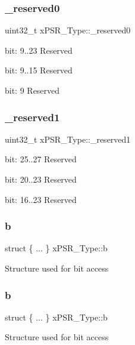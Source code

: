 \subsubsection{\texorpdfstring{\_reserved0}{\_reserved0}}
{\footnotesize\ttfamily uint32\+\_\+t x\+P\+S\+R\+\_\+\+Type\+::\+\_\+reserved0}

bit\+: 9..23 Reserved

bit\+: 9..15 Reserved

bit\+: 9 Reserved \mbox{\label{unionx_p_s_r___type_a790056bb6f20ea16cecc784b0dd19ad6}} 
\subsubsection{\texorpdfstring{\_reserved1}{\_reserved1}}
{\footnotesize\ttfamily uint32\+\_\+t x\+P\+S\+R\+\_\+\+Type\+::\+\_\+reserved1}

bit\+: 25..27 Reserved

bit\+: 20..23 Reserved

bit\+: 16..23 Reserved \mbox{\label{unionx_p_s_r___type_a45ed8981cba3995bc0bd339cb99ba018}} 
\subsubsection{\texorpdfstring{b}{b}\hspace{0.1cm}{\footnotesize\ttfamily [1/12]}}
{\footnotesize\ttfamily struct \{ ... \}   x\+P\+S\+R\+\_\+\+Type\+::b}

Structure used for bit access \mbox{\label{unionx_p_s_r___type_a073e368aa26838bc09405b46e740ade0}} 
\subsubsection{\texorpdfstring{b}{b}\hspace{0.1cm}{\footnotesize\ttfamily [2/12]}}
{\footnotesize\ttfamily struct \{ ... \}   x\+P\+S\+R\+\_\+\+Type\+::b}

Structure used for bit access \mbox{\label{unionx_p_s_r___type_ab231afb9934d09df775d1035a8020e79}} 
